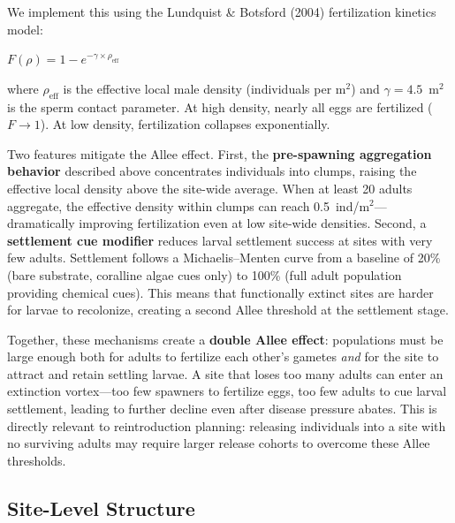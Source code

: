 \documentclass[11pt]{article}
\begin{document}
We implement this using the Lundquist \& Botsford (2004) fertilization kinetics model:

\begin{center}
$F(\rho) = 1 - e^{-\gamma \times \rho_{\text{eff}}}$
\end{center}

\noindent where $\rho_{\text{eff}}$ is the effective local male density (individuals per m$^2$) and $\gamma = 4.5$~m$^2$ is the sperm contact parameter. At high density, nearly all eggs are fertilized ($F \to 1$). At low density, fertilization collapses exponentially.

Two features mitigate the Allee effect. First, the \textbf{pre-spawning aggregation behavior} described above concentrates individuals into clumps, raising the effective local density above the site-wide average. When at least 20 adults aggregate, the effective density within clumps can reach 0.5~ind/m$^2$---dramatically improving fertilization even at low site-wide densities. Second, a \textbf{settlement cue modifier} reduces larval settlement success at sites with very few adults. Settlement follows a Michaelis--Menten curve from a baseline of 20\% (bare substrate, coralline algae cues only) to 100\% (full adult population providing chemical cues). This means that functionally extinct sites are harder for larvae to recolonize, creating a second Allee threshold at the settlement stage.

Together, these mechanisms create a \textbf{double Allee effect}: populations must be large enough both for adults to fertilize each other's gametes \textit{and} for the site to attract and retain settling larvae. A site that loses too many adults can enter an extinction vortex---too few spawners to fertilize eggs, too few adults to cue larval settlement, leading to further decline even after disease pressure abates. This is directly relevant to reintroduction planning: releasing individuals into a site with no surviving adults may require larger release cohorts to overcome these Allee thresholds.

\subsection{Site-Level Structure}
\end{document}
